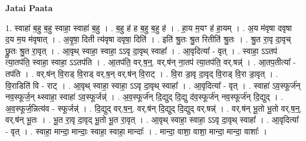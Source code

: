 \documentclass[17pt]{extarticle}
\begin{document}
\textbf{Jatai Paata} \newline

1. स्वाहा॑ ब॒हु ब॒हु स्वाहा॒ स्वाहा॑ ब॒हु । . ब॒हु ह॑ ह ब॒हु ब॒हु ह॑ । . हा॒य म॒यꣳ ह॑ हा॒यम् । . अ॒य म॑वृषा दवृषा द॒य म॒य म॑वृषात् । . अ॒वृ॒षा॒ दिती त्य॑वृषा दवृषा॒ दिति॑ । . इति॑ श्रु॒तः श्रु॒त रितीति॑ श्रु॒तः । . श्रु॒त रा॒वृ दा॒वृच् छ्रु॒तः श्रु॒त रा॒वृत् । . आ॒वृथ् स्वाहा॒ स्वाहा॒ ऽऽवृ दा॒वृथ् स्वाहा᳚ । . आ॒वृदित्या᳚ - वृत् । . स्वाहा॒ ऽऽतप॑ त्या॒तप॑ति॒ स्वाहा॒ स्वाहा॒ ऽऽतप॑ति । . आ॒तप॑ति॒ वर्.ष॒न्॒. वर्.ष॑न् ना॒तप॑ त्या॒तप॑ति॒ वर्.षन्न्॑ । . आ॒तप॒तीत्या᳚ - तप॑ति । . वर्.ष॑न् वि॒राड् वि॒राड् वर्.ष॒न् वर्.ष॑न् वि॒राट् । . वि॒रा डा॒वृ दा॒वृद् वि॒राड् वि॒रा डा॒वृत् । . वि॒राडिति॑ वि - राट् । . आ॒वृथ् स्वाहा॒ स्वाहा॒ ऽऽवृ दा॒वृथ् स्वाहा᳚ । . आ॒वृदित्या᳚ - वृत् । . स्वाहा॑ ऽव॒स्फूर्ज॑न् नव॒स्फूर्ज॒न् थ्स्वाहा॒ स्वाहा॑ ऽव॒स्फूर्जन्न्॑ । . अ॒व॒स्फूर्ज॑न् दि॒द्युद् दि॒द्यु द॑व॒स्फूर्ज॑न् नव॒स्फूर्ज॑न् दि॒द्युद् । . अ॒व॒स्फूर्ज॒न्नित्य॑व - स्फूर्जन्न्॑ । . दि॒द्युद् वर्.ष॒न्॒. वर्.ष॑न् दि॒द्युद् दि॒द्युद् वर्.षन्न्॑ । . वर्.ष॑न् भू॒तो भू॒तो वर्.ष॒न्॒. वर्.ष॑न् भू॒तः । . भू॒त रा॒वृ दा॒वृद् भू॒तो भू॒त रा॒वृत् । . आ॒वृथ् स्वाहा॒ स्वाहा॒ ऽऽवृ दा॒वृथ् स्वाहा᳚ । . आ॒वृदित्या᳚ - वृत् । . स्वाहा॒ मान्दा॒ मान्दाः॒ स्वाहा॒ स्वाहा॒ मान्दाः᳚ । . मान्दा॒ वाशा॒ वाशा॒ मान्दा॒ मान्दा॒ वाशाः᳚ । \newline
\end{document}
